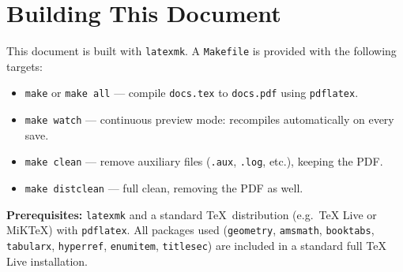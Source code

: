 \documentclass[11pt, a4paper]{article}
\begin{document}
\section{Building This Document}

This document is built with \texttt{latexmk}. A \texttt{Makefile} is provided with the following targets:

\begin{itemize}[label={\textbullet}]
    \item \texttt{make} or \texttt{make all} --- compile \texttt{docs.tex} to \texttt{docs.pdf} using \texttt{pdflatex}.
    \item \texttt{make watch} --- continuous preview mode: recompiles automatically on every save.
    \item \texttt{make clean} --- remove auxiliary files (\texttt{.aux}, \texttt{.log}, etc.), keeping the PDF.
    \item \texttt{make distclean} --- full clean, removing the PDF as well.
\end{itemize}

\noindent\textbf{Prerequisites:} \texttt{latexmk} and a standard \TeX\ distribution (e.g.\ TeX Live or MiKTeX) with \texttt{pdflatex}. All packages used (\texttt{geometry}, \texttt{amsmath}, \texttt{booktabs}, \texttt{tabularx}, \texttt{hyperref}, \texttt{enumitem}, \texttt{titlesec}) are included in a standard full TeX Live installation.
\end{document}
